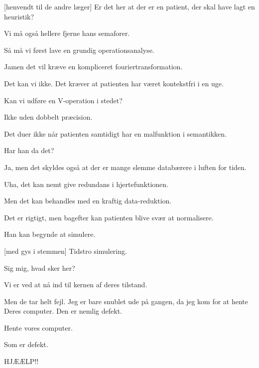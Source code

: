 \documentclass[a4paper,11pt]{article}
\begin{document}
\begin{sketch}
  [henvendt til de andre læger] Er det her at der er en
  patient, der skal have lagt en heuristik?

   Vi må også hellere fjerne hans semaforer.

   Så må vi først lave en grundig operationsanalyse.

   Jamen det vil kræve en kompliceret fouriertransformation.

   Det kan vi ikke.  Det kræver at patienten har været
  kontekstfri i en uge.

   Kan vi udføre en V-operation i stedet?

   Ikke uden dobbelt præcision.

   Det duer ikke når patienten samtidigt har en malfunktion i
  semantikken.

   Har han da det?

   Ja, men det skyldes også at der er mange slemme databærere
  i luften for tiden.

   Uha, det kan nemt give redundans i hjertefunktionen.

   Men det kan behandles med en kraftig data-reduktion.

   Det er rigtigt, men bagefter kan patienten blive svær at normalisere.

   Han kan begynde at simulere.

  [med gys i stemmen] Tidstro simulering.


   Sig mig, hvad sker her?

   Vi er ved at nå ind til kernen af deres tilstand.

   Men de tar helt fejl.  Jeg er bare snublet ude på gangen,
  da jeg kom for at hente Deres computer.  Den er nemlig defekt.


   Hente vores computer.

   Som er defekt.


   HJÆÆLP!!


\end{sketch}
\end{document}
